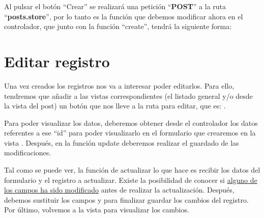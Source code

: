 Al pulsar el botón “Crear” se realizará una petición “\textbf{POST}” a la ruta “\textbf{posts.store}”, por lo tanto es la función que debemos modificar ahora en el controlador, que junto con la función “create”, tendrá la siguiente forma:



\chapter{Editar registro}

Una vez creados los registros nos va a interesar poder editarlos. Para ello, tendremos que añadir a las vistas correspondientes (el listado general y/o desde la vista del post) un botón que nos lleve a la ruta para editar, que es: .

Para poder visualizar los datos, deberemos obtener desde el controlador los datos referentes a ese “id” para poder visualizarlo en el formulario que crearemos en la vista . Después, en la función update deberemos realizar el guardado de las modificaciones.


Tal como se puede ver, la función de actualizar lo que hace es recibir los datos del formulario y el registro a actualizar. Existe la posibilidad de conocer si \href{https://laravel.com/docs/10.x/eloquent#updates}{alguno de los campos ha sido modificado} antes de realizar la actualización. Después, debemos sustituir los campos y para finalizar guardar los cambios del registro. Por último, volvemos a la vista para visualizar los cambios.

